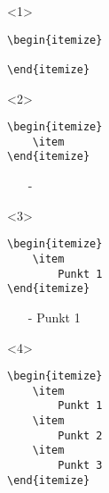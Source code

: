 \begin{frame}[fragile]
	\begin{onlyenv}
		\Code
		\begin{lstlisting}
\begin{itemize}

\end{itemize}
		\end{lstlisting}
	\end{onlyenv}
	\begin{onlyenv}
		\Code
		\begin{lstlisting}
\begin{itemize}
	\item
\end{itemize}
		\end{lstlisting}
		
		\Ausgabe
		\begin{outputbox}
			\begin{itemize}
				\item[-]
			\end{itemize}
		\end{outputbox}
	\end{onlyenv}
	\begin{onlyenv}
		\Code
		\begin{lstlisting}
\begin{itemize}
	\item
		Punkt 1
\end{itemize}
		\end{lstlisting}
		
		\Ausgabe
		\begin{outputbox}
			\begin{itemize}
				\item[-]
					Punkt 1
			\end{itemize}
		\end{outputbox}
	\end{onlyenv}
	\begin{onlyenv}
		\Code
		\begin{lstlisting}
\begin{itemize}
	\item
		Punkt 1
	\item
		Punkt 2
	\item
		Punkt 3
\end{itemize}
		\end{lstlisting}
		

\end{onlyenv}
\end{frame}

